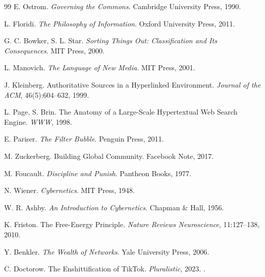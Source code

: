 \documentclass[11pt]{article}
\begin{document}
\begin{thebibliography}{99}
E. Ostrom.
\newblock \emph{Governing the Commons}.
\newblock Cambridge University Press, 1990.

L. Floridi.
\newblock \emph{The Philosophy of Information}.
\newblock Oxford University Press, 2011.

G. C. Bowker, S. L. Star.
\newblock \emph{Sorting Things Out: Classification and Its Consequences}.
\newblock MIT Press, 2000.

L. Manovich.
\newblock \emph{The Language of New Media}.
\newblock MIT Press, 2001.

J. Kleinberg.
\newblock Authoritative Sources in a Hyperlinked Environment.
\newblock \emph{Journal of the ACM}, 46(5):604--632, 1999.

L. Page, S. Brin.
\newblock The Anatomy of a Large-Scale Hypertextual Web Search Engine.
\newblock \emph{WWW}, 1998.

E. Pariser.
\newblock \emph{The Filter Bubble}.
\newblock Penguin Press, 2011.

M. Zuckerberg.
\newblock Building Global Community.
\newblock Facebook Note, 2017.

M. Foucault.
\newblock \emph{Discipline and Punish}.
\newblock Pantheon Books, 1977.

N. Wiener.
\newblock \emph{Cybernetics}.
\newblock MIT Press, 1948.

W. R. Ashby.
\newblock \emph{An Introduction to Cybernetics}.
\newblock Chapman \& Hall, 1956.

K. Friston.
\newblock The Free-Energy Principle.
\newblock \emph{Nature Reviews Neuroscience}, 11:127--138, 2010.

Y. Benkler.
\newblock \emph{The Wealth of Networks}.
\newblock Yale University Press, 2006.

C. Doctorow.
\newblock The Enshittification of TikTok.
\newblock \emph{Pluralistic}, 2023.
.

\end{thebibliography}
\end{document}
